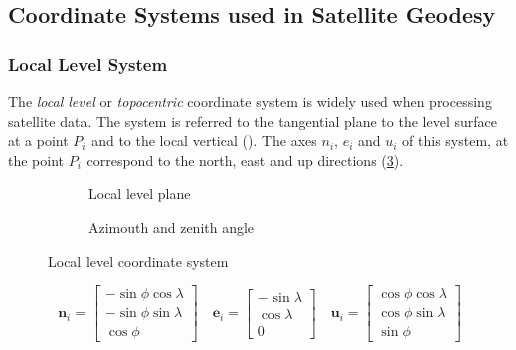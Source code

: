 
\subsection{Coordinate Systems used in Satellite Geodesy}
\label{ssec:coordinate-systems-in-satellite-geodesy}

\subsubsection{Local Level System}
\label{sssec:local-level-system}

The \emph{local level} or \emph{topocentric} coordinate system is widely used 
when processing satellite data. The system is referred to the tangential plane 
to the level surface at a point $P_i$ and to the local vertical (\cite{moritz}). 
The axes $n_i$, $e_i$ and $u_i$ of this system, at the point $P_i$ correspond 
to the north, east and up directions (\ref{fig:local-level-system}).

\begin{figure}
    \centering
    \begin{subfigure}{.4\textwidth}
      \centering
      
      \caption{Local level plane}
      \label{fig:local-level-system-a}
    \end{subfigure}
    \quad
    \quad
    \begin{subfigure}{.4\textwidth}
      \centering
      
      \caption{Azimouth and zenith angle}
      \label{fig:local-level-system-b}
    \end{subfigure}
    \caption{Local level coordinate system}
    \label{fig:local-level-system}
\end{figure}

\begin{equation}
  \bm{n}_i = \begin{bmatrix} 
    -\sin \phi \cos \lambda \\
    -\sin \phi \sin \lambda \\
    \cos \phi
  \end{bmatrix}
  \quad
  \bm{e}_i = \begin{bmatrix} 
    -\sin \lambda \\
    \cos \lambda \\
    0
  \end{bmatrix}
  \quad
  \bm{u}_i = \begin{bmatrix} 
    \cos \phi \cos \lambda \\
    \cos \phi \sin \lambda \\
    \sin \phi
  \end{bmatrix}
\end{equation}


